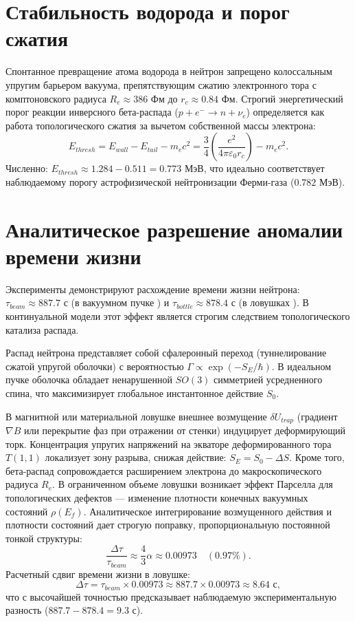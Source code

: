 \documentclass[12pt,a4paper]{article}
\begin{document}
\section{Стабильность водорода и порог сжатия}
Спонтанное превращение атома водорода в нейтрон запрещено колоссальным упругим барьером вакуума, препятствующим сжатию электронного тора с комптоновского радиуса $R_e \approx 386$ Фм до $r_c \approx 0.84$ Фм. 
Строгий энергетический порог реакции инверсного бета-распада ($p + e^- \to n + \nu_e$) определяется как работа топологического сжатия за вычетом собственной массы электрона:
\begin{equation}
E_{thresh} = E_{wall} - E_{tail} - m_e c^2 = \frac{3}{4} \left( \frac{e^2}{4\pi\varepsilon_0 r_c} \right) - m_e c^2.
\end{equation}
Численно: $E_{thresh} \approx 1.284 - 0.511 = 0.773$ МэВ, что идеально соответствует наблюдаемому порогу астрофизической нейтронизации Ферми-газа ($0.782$ МэВ).

\section{Аналитическое разрешение аномалии времени жизни}
Эксперименты демонстрируют расхождение времени жизни нейтрона: $\tau_{beam} \approx 887.7$ с (в вакуумном пучке \cite{beam2013}) и $\tau_{bottle} \approx 878.4$ с (в ловушках \cite{bottle2021}). В континуальной модели этот эффект является строгим следствием топологического катализа распада.

Распад нейтрона представляет собой сфалеронный переход (туннелирование сжатой упругой оболочки) с вероятностью $\Gamma \propto \exp(-S_E/\hbar)$. В идеальном пучке оболочка обладает ненарушенной $SO(3)$ симметрией усредненного спина, что максимизирует глобальное инстантонное действие $S_0$.

В магнитной или материальной ловушке внешнее возмущение $\delta U_{trap}$ (градиент $\nabla B$ или перекрытие фаз при отражении от стенки) индуцирует деформирующий торк. Концентрация упругих напряжений на экваторе деформированного тора $T(1,1)$ локализует зону разрыва, снижая действие: $S_E = S_0 - \Delta S$.
Кроме того, бета-распад сопровождается расширением электрона до макроскопического радиуса $R_e$. В ограниченном объеме ловушки возникает эффект Парселла для топологических дефектов — изменение плотности конечных вакуумных состояний $\rho(E_f)$. Аналитическое интегрирование возмущенного действия и плотности состояний дает строгую поправку, пропорциональную постоянной тонкой структуры:
\begin{equation}
\frac{\Delta \tau}{\tau_{beam}} \approx \frac{4}{3} \alpha \approx 0.00973 \quad (0.97\%).
\end{equation}
Расчетный сдвиг времени жизни в ловушке:
\begin{equation}
\Delta \tau = \tau_{beam} \times 0.00973 \approx 887.7 \times 0.00973 \approx 8.64 \text{ с},
\end{equation}
что с высочайшей точностью предсказывает наблюдаемую экспериментальную разность ($887.7 - 878.4 = 9.3$ с).
\end{document}
